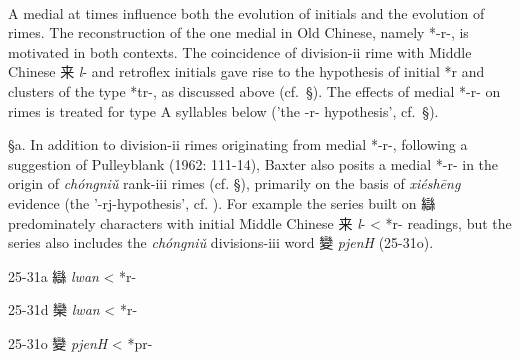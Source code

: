 \paragraph{}
\label{par:old-chinese-medial-r-}
A medial at times influence both the evolution of initials and the
evolution of rimes. The reconstruction of the one medial in Old Chinese,
namely *-r-, is motivated in both contexts. The coincidence of
division-ii rime with Middle Chinese 来  \emph{l}- and retroflex initials
gave rise to the hypothesis of initial *r and clusters of the type *tr-,
as discussed above (cf.~§). The effects of medial *-r- on rimes is
treated for type A syllables below ('the -r- hypothesis', cf.~§).

§a. In addition to division-ii rimes originating from medial *-r-,
following a suggestion of Pulleyblank (1962: 111-14), Baxter also posits
a medial *-r- in the origin of  \emph{chóngniǔ} rank-iii rimes (cf. §),
primarily on the basis of  \emph{xiéshēng} evidence (the
'-rj-hypothesis', cf. 
\cite[280-287]{Baxter1992}). For example the series
built on 䜌 predominately characters with initial Middle Chinese 来
 \emph{l}- \textless{} *r- readings, but the series also includes the
 \emph{chóngniǔ} divisions-iii word 變  \emph{pjenH} (25-31o).

\begin{description} \item
25-31a 䜌  \emph{lwan} \textless{} *r-
\end{description}

\begin{description} \item
25-31d 欒  \emph{lwan} \textless{} *r-
\item
25-31o 變  \emph{pjenH} \textless{} *pr-
\end{description}

